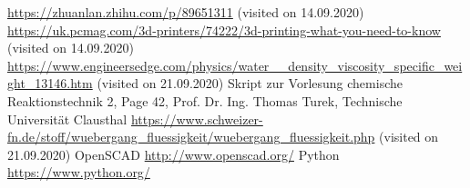 \documentclass[journal,article,submit,moreauthors,pdftex]{Definitions/mdpi}
\begin{document}

\begin{thebibliography}{999}
\url{https://zhuanlan.zhihu.com/p/89651311} (visited on 14.09.2020)
\url{https://uk.pcmag.com/3d-printers/74222/3d-printing-what-you-need-to-know} (visited on 14.09.2020)
\url{https://www.engineersedge.com/physics/water\_\_density\_viscosity\_specific\_weight\_13146.htm} (visited on 21.09.2020)
Skript zur Vorlesung chemische Reaktionstechnik 2, Page 42, Prof. Dr. Ing. Thomas Turek, Technische Universität Clausthal
\url{https://www.schweizer-fn.de/stoff/wuebergang_fluessigkeit/wuebergang_fluessigkeit.php} (visited on 21.09.2020)
OpenSCAD \url{http://www.openscad.org/}
Python \url{https://www.python.org/}
\end{thebibliography}


%



\end{document}
